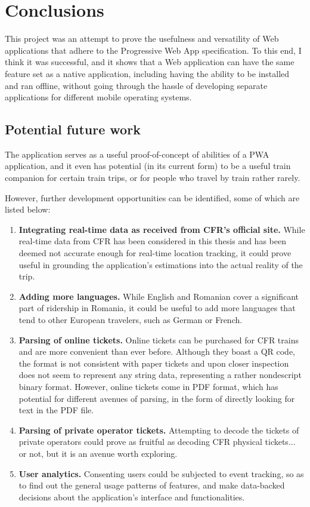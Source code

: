 \chapter{Conclusions}

This project was an attempt to prove the usefulness and versatility of Web applications that adhere to the Progressive Web App specification. To this end, I think it was successful, and it shows that a Web application can have the same feature set as a native application, including having the ability to be installed and ran offline, without going through the hassle of developing separate applications for different mobile operating systems.

\section{Potential future work}
The application serves as a useful proof-of-concept of abilities of a PWA application, and it even has potential (in its current form) to be a useful train companion for certain train trips, or for people who travel by train rather rarely.

However, further development opportunities can be identified, some of which are listed below:

\begin{enumerate}
    \item \textbf{Integrating real-time data as received from CFR's official site.} While real-time data from CFR has been considered in this thesis and has been deemed not accurate enough for real-time location tracking, it could prove useful in grounding the application's estimations into the actual reality of the trip.
    \item \textbf{Adding more languages.} While English and Romanian cover a significant part of ridership in Romania, it could be useful to add more languages that tend to other European travelers, such as German or French.
    \item \textbf{Parsing of online tickets.} Online tickets can be purchased for CFR trains and are more convenient than ever before. Although they boast a QR code, the format is not consistent with paper tickets and upon closer inspection does not seem to represent any string data, representing a rather nondescript binary format. However, online tickets come in PDF format, which has potential for different avenues of parsing, in the form of directly looking for text in the PDF file.
    \item \textbf{Parsing of private operator tickets.} Attempting to decode the tickets of private operators could prove as fruitful as decoding CFR physical tickets... or not, but it is an avenue worth exploring.
    \item \textbf{User analytics.} Consenting users could be subjected to event tracking, so as to find out the general usage patterns of features, and make data-backed decisions about the application's interface and functionalities.
\end{enumerate}